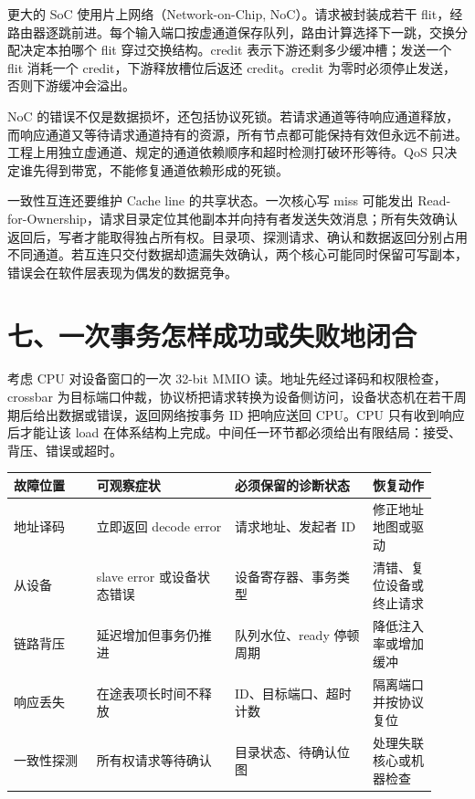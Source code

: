 更大的 SoC 使用片上网络（Network-on-Chip, NoC）。请求被封装成若干 flit，经路由器逐跳前进。每个输入端口按虚通道保存队列，路由计算选择下一跳，交换分配决定本拍哪个 flit 穿过交换结构。credit 表示下游还剩多少缓冲槽；发送一个 flit 消耗一个 credit，下游释放槽位后返还 credit。credit 为零时必须停止发送，否则下游缓冲会溢出。

NoC 的错误不仅是数据损坏，还包括协议死锁。若请求通道等待响应通道释放，而响应通道又等待请求通道持有的资源，所有节点都可能保持有效但永远不前进。工程上用独立虚通道、规定的通道依赖顺序和超时检测打破环形等待。QoS 只决定谁先得到带宽，不能修复通道依赖形成的死锁。

一致性互连还要维护 Cache line 的共享状态。一次核心写 miss 可能发出 Read-for-Ownership，请求目录定位其他副本并向持有者发送失效消息；所有失效确认返回后，写者才能取得独占所有权。目录项、探测请求、确认和数据返回分别占用不同通道。若互连只交付数据却遗漏失效确认，两个核心可能同时保留可写副本，错误会在软件层表现为偶发的数据竞争。

\section{七、一次事务怎样成功或失败地闭合}

考虑 CPU 对设备窗口的一次 32-bit MMIO 读。地址先经过译码和权限检查，crossbar 为目标端口仲裁，协议桥把请求转换为设备侧访问，设备状态机在若干周期后给出数据或错误，返回网络按事务 ID 把响应送回 CPU。CPU 只有收到响应后才能让该 load 在体系结构上完成。中间任一环节都必须给出有限结局：接受、背压、错误或超时。

\begin{longtable}{L{0.18\linewidth}L{0.30\linewidth}L{0.30\linewidth}L{0.14\linewidth}}
\toprule
故障位置 & 可观察症状 & 必须保留的诊断状态 & 恢复动作 \\
\midrule
地址译码 & 立即返回 decode error & 请求地址、发起者 ID & 修正地址地图或驱动 \\\tablerowrule
从设备 & slave error 或设备状态错误 & 设备寄存器、事务类型 & 清错、复位设备或终止请求 \\\tablerowrule
链路背压 & 延迟增加但事务仍推进 & 队列水位、ready 停顿周期 & 降低注入率或增加缓冲 \\\tablerowrule
响应丢失 & 在途表项长时间不释放 & ID、目标端口、超时计数 & 隔离端口并按协议复位 \\\tablerowrule
一致性探测 & 所有权请求等待确认 & 目录状态、待确认位图 & 处理失联核心或机器检查 \\
\bottomrule
\end{longtable}




























